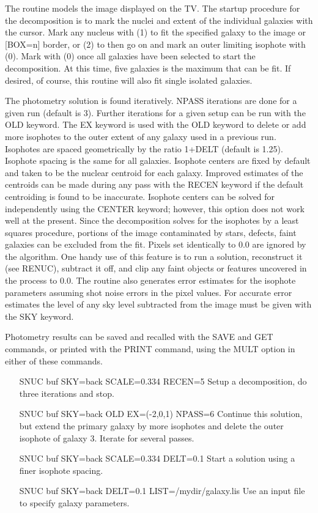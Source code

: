 The routine models the image displayed on the TV.  The startup procedure
for the decomposition is to mark the nuclei and extent of the individual
galaxies with the cursor.  Mark any nucleus with (1) to fit the specified
galaxy to the image or {[BOX=n]} border, or (2) to then go on and mark an
outer limiting isophote with (0).  Mark with (0) once all galaxies have
been selected to start the decomposition.  At this time, five galaxies is
the maximum that can be fit.  If desired, of course, this routine will also
fit single isolated galaxies.

The photometry solution is found iteratively.  NPASS iterations are done
for a given run (default is 3).  Further iterations for a given setup can
be run with the OLD keyword.  The EX keyword is used with the OLD keyword
to delete or add more isophotes to the outer extent of any galaxy used in a
previous run.  Isophotes are spaced geometrically by the ratio 1+DELT
(default is 1.25).  Isophote spacing is the same for all galaxies.
Isophote centers are fixed by default and taken to be the nuclear centroid
for each galaxy.  Improved estimates of the centroids can be made during
any pass with the RECEN keyword if the default centroiding is found to be
inaccurate. Isophote centers can be solved for independently using the
CENTER keyword; however, this option does not work well at the present.
Since the decomposition solves for the isophotes by a least squares
procedure, portions of the image contaminated by stars, defects, faint
galaxies can be excluded from the fit.  Pixels set identically to 0.0 are
ignored by the algorithm.  One handy use of this feature is to run a
solution, reconstruct it (see RENUC), subtract it off, and clip any faint
objects or features uncovered in the process to 0.0.  The routine also
generates error estimates for the isophote parameters assuming shot noise
errors in the pixel values.  For accurate error estimates the level of any
sky level subtracted from the image must be given with the SKY keyword.

Photometry results can be saved and recalled with the SAVE and GET
commands, or printed with the PRINT command, using the MULT option in
either of these commands.
\begin{itemize}
  \item[SNUC buf SKY=back SCALE=0.334 RECEN=5\hfill]{Setup a
       decomposition, do three iterations and stop.}

  \item[SNUC buf SKY=back OLD EX=(-2,0,1) NPASS=6\hfill]{Continue this
       solution, but extend the primary galaxy by more isophotes and delete
       the outer isophote of galaxy 3.  Iterate for several passes.}

  \item[SNUC buf SKY=back SCALE=0.334 DELT=0.1\hfill]{Start a solution
       using a finer isophote spacing.}

  \item[SNUC buf SKY=back DELT=0.1 LIST=/mydir/galaxy.lis\hfill]{Use an
       input file to specify galaxy parameters.}
\end{itemize}

